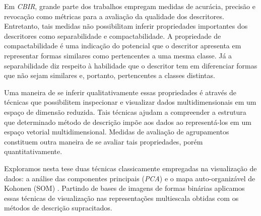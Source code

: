 Em \emph{CBIR}, grande parte dos trabalhos empregam medidas de acurácia, precisão e revocação como métricas para a avaliação da qualidade dos descritores. Entretanto, tais medidas não possibilitam inferir propriedades importantes dos descritores como  separabilidade e compactabilidade. A propriedade de compactabilidade é uma indicação do potencial que o descritor apresenta em representar formas similares como pertencentes a uma mesma classe. Já a separabilidade diz respeito à habilidade que o descritor tem em diferenciar formas que não sejam similares e, portanto, pertencentes a classes distintas. 

Uma maneira de se inferir qualitativamente essas propriedades é através de técnicas que possibilitem inspecionar e visualizar dados multidimensionais em um espaço de dimensão reduzida. Tais técnicas ajudam a compreender a estrutura que determinado método de descrição impõe aos dados ao representá-los em um espaço vetorial multidimensional. Medidas de avaliação de agrupamentos constituem outra maneira de se avaliar tais propriedades, porém quantitativamente. 

Exploramos nesta tese duas técnicas classicamente empregadas na visualização de dados: a análise das componentes principais (\emph{PCA}) e o mapa auto-organizável de Kohonen (SOM) \cite{Kohonen:1982}. Partindo de bases de imagens de formas binárias aplicamos essas técnicas de visualização nas representações multiescala obtidas com os métodos de descrição supracitados.   
 



